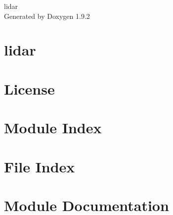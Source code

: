 \documentclass[twoside]{book}
\newcommand{\+}{\discretionary{\mbox{\scriptsize$\hookleftarrow$}}{}{}}
\newcommand{\clearemptydoublepage}{%
    \newpage{\pagestyle{empty}\cleardoublepage}%
  }
\begin{document}
  \raggedbottom
    \hypersetup{pageanchor=false,
                bookmarksnumbered=true,
                pdfencoding=unicode
               }
  \begin{titlepage}
  \vspace*{7cm}
  \begin{center}%
  {\Large lidar}\\
  \vspace*{1cm}
  {\large Generated by Doxygen 1.9.2}\\
  \end{center}
  \end{titlepage}
  \clearemptydoublepage
  \tableofcontents
  \clearemptydoublepage
  \hypersetup{pageanchor=true}
\chapter{lidar}
\label{index}\hypertarget{index}{}
\chapter{License}
\label{_license}

\chapter{Module Index}

\chapter{File Index}

\chapter{Module Documentation}



















\end{document}
